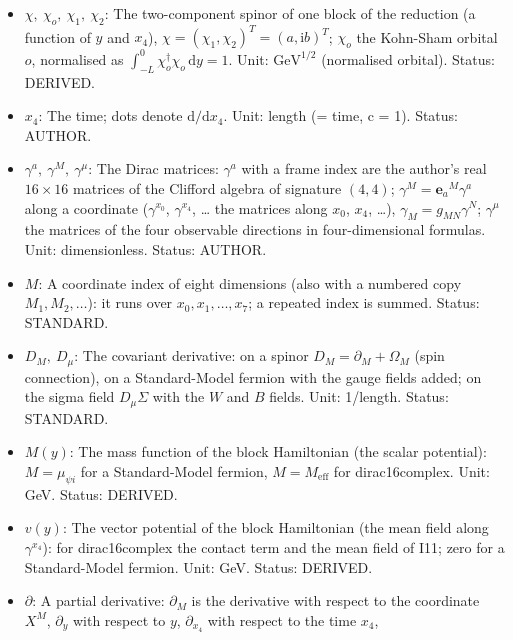 \documentclass[
  10pt,
]{article}
\begin{document}
\begin{itemize}
  ansatz that places the two-component spinor \(\chi\) of one block into
  the 16 components of the eight-dimensional spinor. Unit:
  dimensionless. Status: DERIVED.
\item
  \(\chi,\ \chi_o,\ \chi_1,\ \chi_2\): The two-component spinor of one
  block of the reduction (a function of \(y\) and \(x_4\)),
  \(\chi = (\chi_1, \chi_2)^T = (a, \mathrm{i}b)^T\); \(\chi_o\) the
  Kohn-Sham orbital \(o\), normalised as
  \(\int_{-L}^{0}\chi_o^\dagger\chi_o\,\mathrm{d}y = 1\). Unit:
  \(\mathrm{GeV}^{1/2}\) (normalised orbital). Status: DERIVED.
\item
  \(x_4\): The time; dots denote \(\mathrm{d}/\mathrm{d}x_4\). Unit:
  length (= time, c = 1). Status: AUTHOR.
\item
  \(\gamma^a,\ \gamma^M,\ \gamma^\mu\): The Dirac matrices: \(\gamma^a\)
  with a frame index are the author's real \(16 \times 16\) matrices of
  the Clifford algebra of signature \((4, 4)\);
  \(\gamma^M = \mathbf{e}_a{}^M\gamma^a\) along a coordinate
  (\(\gamma^{x_0}\), \(\gamma^{x_4}\), \ldots{} the matrices along
  \(x_0\), \(x_4\), \ldots), \(\gamma_M = g_{MN}\gamma^N\);
  \(\gamma^\mu\) the matrices of the four observable directions in
  four-dimensional formulas. Unit: dimensionless. Status: AUTHOR.
\item
  \(M\): A coordinate index of eight dimensions (also with a numbered
  copy \(M_1, M_2, \dots\)): it runs over \(x_0, x_1, \dots, x_7\); a
  repeated index is summed. Status: STANDARD.
\item
  \(D_M,\ D_\mu\): The covariant derivative: on a spinor
  \(D_M = \partial_M + \Omega_M\) (spin connection), on a Standard-Model
  fermion with the gauge fields added; on the sigma field
  \(D_\mu\Sigma\) with the \(W\) and \(B\) fields. Unit: 1/length.
  Status: STANDARD.
\item
  \(M(y)\): The mass function of the block Hamiltonian (the scalar
  potential): \(M = \mu_{\psi i}\) for a Standard-Model fermion,
  \(M = M_{\mathrm{eff}}\) for dirac16complex. Unit: GeV. Status:
  DERIVED.
\item
  \(v(y)\): The vector potential of the block Hamiltonian (the mean
  field along \(\gamma^{x_4}\)): for dirac16complex the contact term and
  the mean field of I11; zero for a Standard-Model fermion. Unit: GeV.
  Status: DERIVED.
\item
  \(\partial\): A partial derivative: \(\partial_M\) is the derivative
  with respect to the coordinate \(X^M\), \(\partial_y\) with respect to
  \(y\), \(\partial_{x_4}\) with respect to the time \(x_4\),

\end{itemize}
\end{document}
